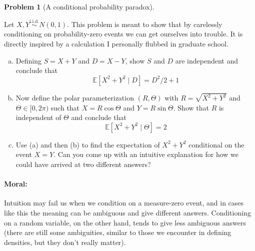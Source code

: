 \documentclass{article}
\newcommand{\EE}{\mathbb{E}}
\newcommand{\simiid}{\overset{\text{i.i.d.}}{\sim}}
\theoremstyle{definition}
\newtheorem{problem}{Problem}
\begin{document}
\begin{problem}[A conditional probability paradox]
\label{prob:conditional-paradox}

Let $X,Y \simiid N(0,1)$. This problem is meant to show that by carelessly conditioning on probability-zero events we can get ourselves into trouble. It is directly inspired by a calculation I personally flubbed in graduate school.

\begin{enumerate}[(a)]
\item Defining $S = X + Y$ and $D = X - Y$, show $S$ and $D$ are independent and conclude that
\[
\EE[X^2 + Y^2 \mid D] = D^2/2 + 1
\]



\item Now define the polar parameterization $(R,\Theta)$ with $R = \sqrt{X^2 + Y^2}$ and $\Theta \in [0,2\pi)$ such that $X  = R\cos \Theta$ and $Y = R\sin \Theta$. Show that $R$ is independent of $\Theta$ and conclude that
\[
\EE[X^2 + Y^2 \mid \Theta] = 2
\]



\item Use (a) and then (b) to find the expectation of $X^2 + Y^2$ conditional on the event $X = Y$. Can you come up with an intuitive explanation for how we could have arrived at two different answers?



\end{enumerate}

\paragraph{Moral:} Intuition may fail us when we condition on a measure-zero event, and in cases like this the meaning can be ambiguous and give different answers. Conditioning on a random variable, on the other hand, tends to give less ambiguous answers (there are still some ambiguities, similar to those we encounter in defining densities, but they don't really matter).
\end{problem}
\end{document}
